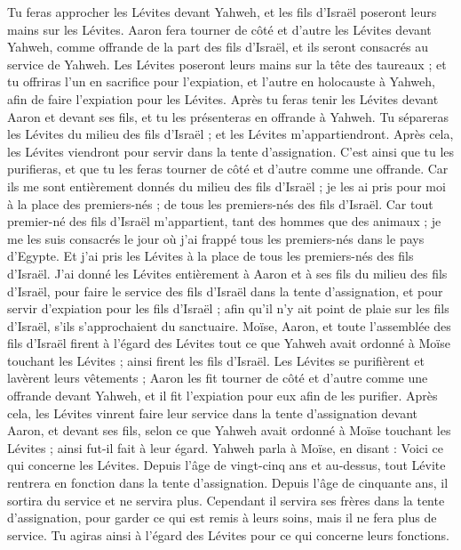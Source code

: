 \begin{multicols}{2}
Tu feras approcher les Lévites devant Yahweh, et les fils d'Israël poseront leurs mains sur les Lévites.
Aaron fera tourner de côté et d’autre les Lévites devant Yahweh, comme offrande de la part des fils d'Israël, et ils seront consacrés au service de Yahweh.
Les Lévites poseront leurs mains sur la tête des taureaux ; et tu offriras l’un en sacrifice pour l’expiation, et l'autre en holocauste à Yahweh, afin de faire l’expiation pour les Lévites.
Après tu feras tenir les Lévites devant Aaron et devant ses fils, et tu les présenteras en offrande à Yahweh.
Tu sépareras les Lévites du milieu des fils d'Israël ; et les Lévites m’appartiendront.
Après cela, les Lévites viendront pour servir dans la tente d'assignation. C’est ainsi que tu les purifieras, et que tu les feras tourner de côté et d’autre comme une offrande.
Car ils me sont entièrement donnés du milieu des fils d'Israël ; je les ai pris pour moi à la place des premiers-nés ; de tous les premiers-nés des fils d'Israël.
Car tout premier-né des fils d'Israël m’appartient, tant des hommes que des animaux ; je me les suis consacrés le jour où j’ai frappé tous les premiers-nés dans le pays d'Egypte.
Et j'ai pris les Lévites à la place de tous les premiers-nés des fils d'Israël.
J'ai donné les Lévites entièrement à Aaron et à ses fils du milieu des fils d'Israël, pour faire le service des fils d'Israël dans la tente d'assignation, et pour servir d’expiation pour les fils d'Israël ; afin qu'il n'y ait point de plaie sur les fils d'Israël, s’ils s'approchaient du sanctuaire.
Moïse, Aaron, et toute l'assemblée des fils d'Israël firent à l’égard des Lévites tout ce que Yahweh avait ordonné à Moïse touchant les Lévites ; ainsi firent les fils d'Israël.
Les Lévites se purifièrent et lavèrent leurs vêtements ; Aaron les fit tourner de côté et d’autre comme une offrande devant Yahweh, et il fit l'expiation pour eux afin de les purifier.
Après cela, les Lévites vinrent faire leur service dans la tente d'assignation devant Aaron, et devant ses fils, selon ce que Yahweh avait ordonné à Moïse touchant les Lévites ; ainsi fut-il fait à leur égard.
Yahweh parla à Moïse, en disant :
Voici ce qui concerne les Lévites. Depuis l'âge de vingt-cinq ans et au-dessus, tout Lévite rentrera en fonction dans la tente d'assignation.
Depuis l'âge de cinquante ans, il sortira du service et ne servira plus.
Cependant il servira ses frères dans la tente d'assignation, pour garder ce qui est remis à leurs soins, mais il ne fera plus de service. Tu agiras ainsi à l’égard des Lévites pour ce qui concerne leurs fonctions.

\end{multicols}
